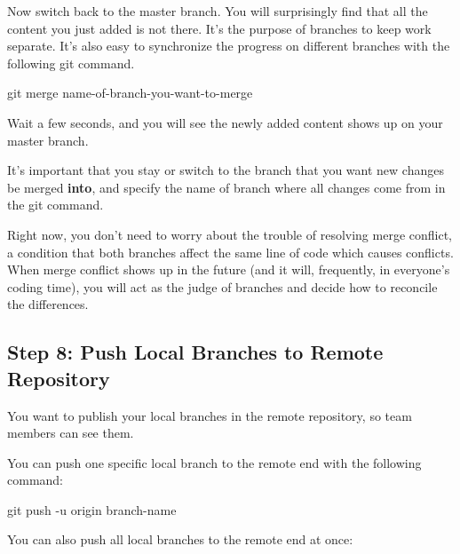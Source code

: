 \documentclass[
  letterpaper,
  DIV=11,
  numbers=noendperiod]{scrartcl}
\newenvironment{Shaded}{\begin{snugshade}}{\end{snugshade}}
\newcommand{\NormalTok}[1]{\textcolor[rgb]{0.00,0.23,0.31}{#1}}
\newcommand{\SpecialCharTok}[1]{\textcolor[rgb]{0.37,0.37,0.37}{#1}}
\begin{document}
Now switch back to the master branch. You will surprisingly find that
all the content you just added is not there. It's the purpose of
branches to keep work separate. It's also easy to synchronize the
progress on different branches with the following git command.

\begin{Shaded}
\begin{Highlighting}[]
\NormalTok{git merge name}\SpecialCharTok{{-}}\NormalTok{of}\SpecialCharTok{{-}}\NormalTok{branch}\SpecialCharTok{{-}}\NormalTok{you}\SpecialCharTok{{-}}\NormalTok{want}\SpecialCharTok{{-}}\NormalTok{to}\SpecialCharTok{{-}}\NormalTok{merge}
\end{Highlighting}
\end{Shaded}

Wait a few seconds, and you will see the newly added content shows up on
your master branch.

It's important that you stay or switch to the branch that you want new
changes be merged \textbf{into}, and specify the name of branch where
all changes come from in the git command.

Right now, you don't need to worry about the trouble of resolving merge
conflict, a condition that both branches affect the same line of code
which causes conflicts. When merge conflict shows up in the future (and
it will, frequently, in everyone's coding time), you will act as the
judge of branches and decide how to reconcile the differences.

\subsection{Step 8: Push Local Branches to Remote
Repository}\label{step-8-push-local-branches-to-remote-repository}

You want to publish your local branches in the remote repository, so
team members can see them.

You can push one specific local branch to the remote end with the
following command:

\begin{Shaded}
\begin{Highlighting}[]
\NormalTok{git push }\SpecialCharTok{{-}}\NormalTok{u origin branch}\SpecialCharTok{{-}}\NormalTok{name}
\end{Highlighting}
\end{Shaded}

You can also push all local branches to the remote end at once:
\end{document}
